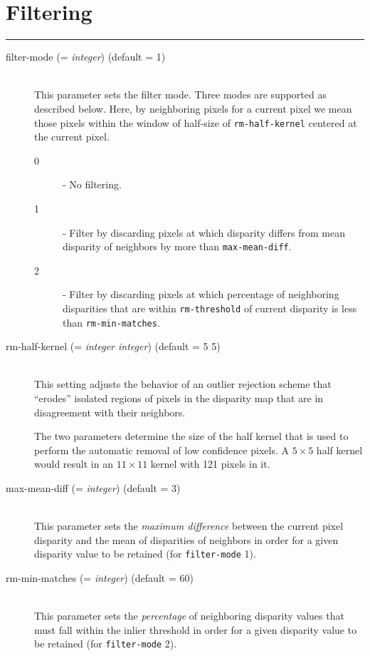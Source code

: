 \section{Filtering}
\label{filter_options}

\hrule
\bigskip

\begin{description}

\item[filter-mode \textnormal{\small{(= \emph{integer})}} (default = 1)]
\hfill \\ This parameter sets the filter mode. Three modes are supported
as described below. Here, by neighboring pixels for a current pixel we
mean those pixels within the window of half-size of
\texttt{rm-half-kernel} centered at the current pixel.
  \begin{description}
    \item[0] - No filtering.
    \item[1] - Filter by discarding pixels at which disparity differs from mean disparity of neighbors by more than \texttt{max-mean-diff}. 
    \item[2] - Filter by discarding pixels at which percentage of neighboring disparities that are within \texttt{rm-threshold} of current disparity is less than \texttt{rm-min-matches}. 
  \end{description}
 
\item[rm-half-kernel \textnormal{\small{(= \emph{integer integer})}} (default = 5 5)] \hfill \\
  This setting adjusts the behavior of an outlier rejection scheme
  that ``erodes'' isolated regions of pixels in the disparity map that
  are in disagreement with their neighbors.

  The two parameters determine the size of the half kernel that is
  used to perform the automatic removal of low confidence pixels.  A
  $5 \times 5$ half kernel would result in an $11 \times 11$ kernel
  with 121 pixels in it.

\item[max-mean-diff \textnormal{\small{(= \emph{integer})}} (default = 3)] \hfill \\
  This parameter sets the {\em maximum difference} between the current pixel disparity and the mean of disparities of neighbors in order for a
  given disparity value to be retained (for \texttt{filter-mode} 1).

\item[rm-min-matches \textnormal{\small{(= \emph{integer})}} (default = 60)] \hfill \\
  This parameter sets the {\em percentage} of neighboring disparity
  values that must fall within the inlier threshold in order for a
  given disparity value to be retained (for \texttt{filter-mode} 2).


\end{description}
